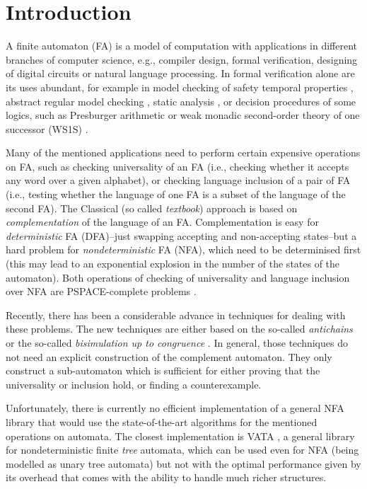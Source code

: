 \chapter{Introduction}
\label{introduction}
A finite automaton (FA) is a model of computation with applications in different branches of computer science, e.g., compiler design, formal verification, 
designing of digital circuits or natural language processing. In formal verification alone are its uses abundant, 
for example in model checking of safety temporal properties \cite{principles}, abstract regular model checking \cite{armc}, static analysis \cite{metal}, 
or decision procedures of some logics, such as Presburger arithmetic or weak 
monadic second-order theory of one successor (WS1S) \cite{mona}.

Many of the mentioned applications need to perform certain expensive operations on FA, such as checking universality of an FA (i.e., checking whether it
accepts any word over a given alphabet), or checking language inclusion of a pair of FA (i.e., testing whether the language of one FA is a subset of the language
of the second FA). The Classical (so called \emph{textbook}) approach is based on \emph{complementation} of the language of an FA. Complementation is easy for 
\emph{deterministic} FA (DFA)--just swapping accepting and non-accepting states--but a hard problem for \emph{nondeterministic} FA (NFA), which need 
to be determinised first (this may lead to an exponential explosion in the number of the states of the automaton). 
Both operations of checking of universality and language inclusion over NFA are PSPACE-complete problems \cite{cav06}.

Recently, there has been a considerable advance in techniques for dealing with these problems. The new techniques are either based on the so-called 
\emph{antichains} \cite{cav06,tacas10} or the so-called \emph{bisimulation up to congruence} \cite{popl13}. 
In general, those techniques do not need an explicit construction of the complement
automaton. They only construct a sub-automaton which is sufficient for either proving that the universality or inclusion hold, or finding a counterexample.

Unfortunately, there is currently no efficient implementation of a general NFA library that would use the state-of-the-art algorithms for the mentioned
operations on automata. The
closest implementation is VATA \cite{libvata}, a general library for nondeterministic finite \emph{tree} automata, which can be used even for NFA (being modelled 
as unary tree automata) but not with the optimal performance given by its overhead that comes with the ability to handle much richer structures. 
 
